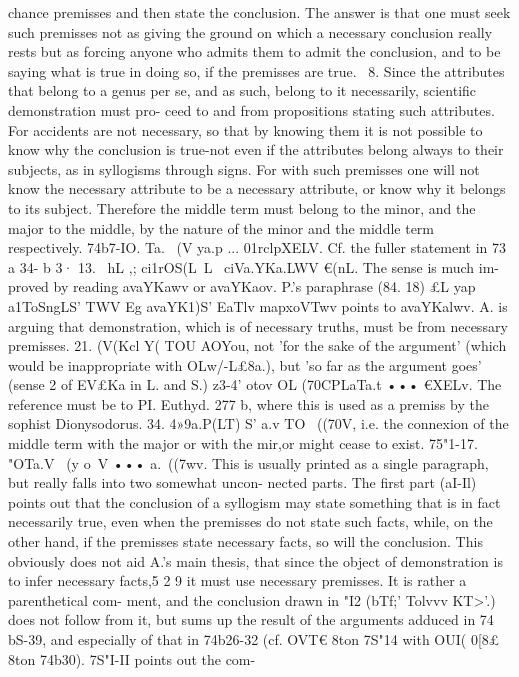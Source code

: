 {{{{{{chance premisses and then state the conclusion. The answer is
that one must seek such premisses not as giving the ground on
which a necessary conclusion really rests but as forcing anyone
who admits them to admit the conclusion, and to be saying what
is true in doing so, if the premisses are true.
~8. Since the attributes that belong to a genus per se, and as
such, belong to it necessarily, scientific demonstration must pro-
ceed to and from propositions stating such attributes. For
accidents are not necessary, so that by knowing them it is not
possible to know why the conclusion is true-not even if the
attributes belong always to their subjects, as in syllogisms
through signs. For with such premisses one will not know the
necessary attribute to be a necessary attribute, or know why it
belongs to its subject. Therefore the middle term must belong
to the minor, and the major to the middle, by the nature of the
minor and the middle term respectively.
74b7-IO. Ta. ~(V ya.p ... 01rclpXELV. Cf. the fuller statement in
73 a 34- b 3·
13. ~hL ,; ci1rOS(L~L~ ciVa.YKa.LWV €(nL. The sense is much im-
proved by reading avaYKa{wv or avaYKa{ov. P.'s paraphrase
(84. 18) £L yap ~ a1ToSngLS' TWV Eg avaYK1)S' EaTlv {mapxoVTwv points to
avaYKalwv. A. is arguing that demonstration, which is of necessary
truths, must be from necessary premisses.
21. (V(Kcl Y( TOU AOYou, not 'for the sake of the argument'
(which would be inappropriate with OLw/-L£8a.), but 'so far as the
argument goes' (sense 2 of EV£Ka in L. and S.)
z3-4' otov OL (70CPLaTa.t ••• €XELv. The reference must be to
PI. Euthyd. 277 b, where this is used as a premiss by the sophist
Dionysodorus.
34. 4»9a.P(LT) S' a.v TO ~((70V, i.e. the connexion of the middle
term with the major or with the mir,or might cease to exist.
75"1-17. "OTa.V ~(y o~V ••• a.~((7wv. This is usually printed as
a single paragraph, but really falls into two somewhat uncon-
nected parts. The first part (aI-Il) points out that the conclusion
of a syllogism may state something that is in fact necessarily
true, even when the premisses do not state such facts, while,
on the other hand, if the premisses state necessary facts, so will
the conclusion. This obviously does not aid A.'s main thesis,
that since the object of demonstration is to infer necessary facts,5 2 9
it must use necessary premisses. It is rather a parenthetical com-
ment, and the conclusion drawn in "I2 (bTf;' Tolvvv KT>'.) does not
follow from it, but sums up the result of the arguments adduced
in 74 bS-39, and especially of that in 74b26-32 (cf. OVT€ 8ton
7S"14 with OUI( 0[8£ 8ton 74b30). 7S"I-II points out the com-
}}}}}}}}}
